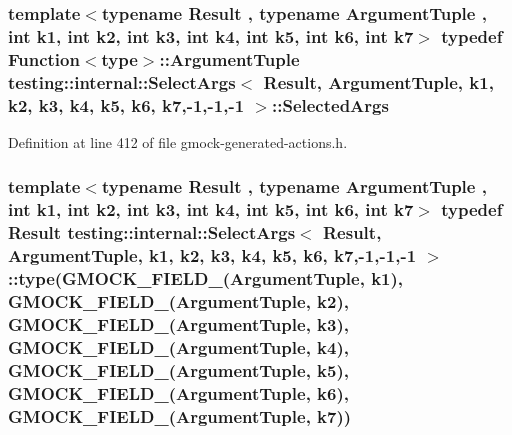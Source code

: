 \subsubsection[{\texorpdfstring{Selected\+Args}{SelectedArgs}}]{\setlength{\rightskip}{0pt plus 5cm}template$<$typename Result , typename Argument\+Tuple , int k1, int k2, int k3, int k4, int k5, int k6, int k7$>$ typedef {\bf Function}$<${\bf type}$>$\+::{\bf Argument\+Tuple} {\bf testing\+::internal\+::\+Select\+Args}$<$ {\bf Result}, {\bf Argument\+Tuple}, k1, k2, k3, k4, k5, k6, k7,-\/1,-\/1,-\/1 $>$\+::{\bf Selected\+Args}}\hypertarget{classtesting_1_1internal_1_1_select_args_3_01_result_00_01_argument_tuple_00_01k1_00_01k2_00_01k597f472c4e3b394b8bb76f22686b8756_a921cc8e0f8e0453024d95e80933e7346}{}\label{classtesting_1_1internal_1_1_select_args_3_01_result_00_01_argument_tuple_00_01k1_00_01k2_00_01k597f472c4e3b394b8bb76f22686b8756_a921cc8e0f8e0453024d95e80933e7346}


Definition at line 412 of file gmock-\/generated-\/actions.\+h.

\subsubsection[{\texorpdfstring{type}{type}}]{\setlength{\rightskip}{0pt plus 5cm}template$<$typename Result , typename Argument\+Tuple , int k1, int k2, int k3, int k4, int k5, int k6, int k7$>$ typedef {\bf Result} {\bf testing\+::internal\+::\+Select\+Args}$<$ {\bf Result}, {\bf Argument\+Tuple}, k1, k2, k3, k4, k5, k6, k7,-\/1,-\/1,-\/1 $>$\+::type({\bf G\+M\+O\+C\+K\+\_\+\+F\+I\+E\+L\+D\+\_\+}({\bf Argument\+Tuple}, k1), {\bf G\+M\+O\+C\+K\+\_\+\+F\+I\+E\+L\+D\+\_\+}({\bf Argument\+Tuple}, k2), {\bf G\+M\+O\+C\+K\+\_\+\+F\+I\+E\+L\+D\+\_\+}({\bf Argument\+Tuple}, k3), {\bf G\+M\+O\+C\+K\+\_\+\+F\+I\+E\+L\+D\+\_\+}({\bf Argument\+Tuple}, k4), {\bf G\+M\+O\+C\+K\+\_\+\+F\+I\+E\+L\+D\+\_\+}({\bf Argument\+Tuple}, k5), {\bf G\+M\+O\+C\+K\+\_\+\+F\+I\+E\+L\+D\+\_\+}({\bf Argument\+Tuple}, k6), {\bf G\+M\+O\+C\+K\+\_\+\+F\+I\+E\+L\+D\+\_\+}({\bf Argument\+Tuple}, k7))}\hypertarget{classtesting_1_1internal_1_1_select_args_3_01_result_00_01_argument_tuple_00_01k1_00_01k2_00_01k597f472c4e3b394b8bb76f22686b8756_a253d700a1af06add7100c05277a6ae4d}{}\label{classtesting_1_1internal_1_1_select_args_3_01_result_00_01_argument_tuple_00_01k1_00_01k2_00_01k597f472c4e3b394b8bb76f22686b8756_a253d700a1af06add7100c05277a6ae4d}


